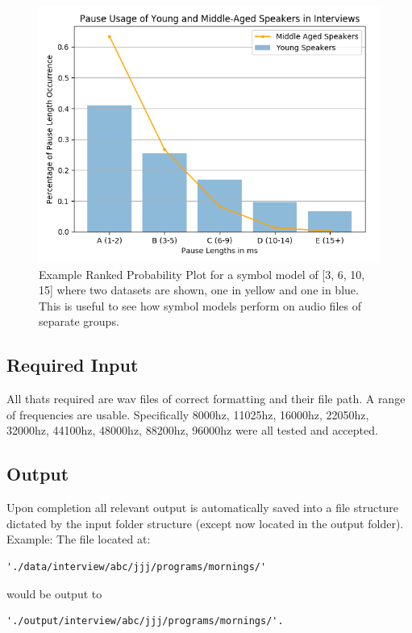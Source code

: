 
\begin{figure}[h!]
	\begin{center}
		\includegraphics[scale=0.6]{src/main-matter/methodology/code-base/output/dual_ranked_probability}
		\caption{Example Ranked Probability Plot for a symbol model of [3, 6, 10, 15] where two datasets are shown, one in yellow and one in blue. This is useful to see how symbol models perform on audio files of separate groups.}
		\label{default}
	\end{center}
\end{figure}

\subsection{Required Input} All thats required are wav files of correct formatting and their file path. A range of frequencies are usable. Specifically 8000hz, 11025hz, 16000hz, 22050hz, 32000hz, 44100hz, 48000hz, 88200hz, 96000hz were all tested and accepted.

\subsection{Output} Upon completion all relevant output is automatically saved into a file structure dictated by the input folder structure (except now located in the output folder). Example: The file located at: 
\begin{verbatim}
'./data/interview/abc/jjj/programs/mornings/'
\end{verbatim}
would be output to 
\begin{verbatim}
'./output/interview/abc/jjj/programs/mornings/'.
\end{verbatim}

